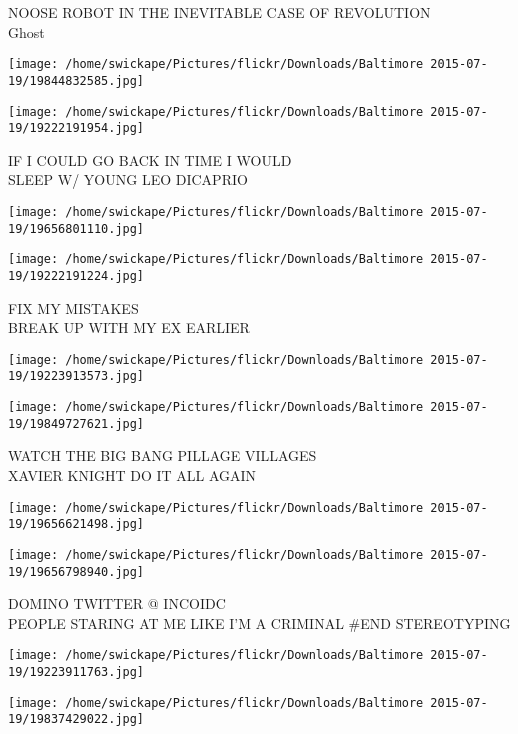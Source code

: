 \documentclass[10pt,letterpaper]{article}
\begin{document}
NOOSE ROBOT IN THE INEVITABLE CASE OF REVOLUTION\\
Ghost
\pagebreak

\texttt{[image: /home/swickape/Pictures/flickr/Downloads/Baltimore 2015-07-19/19844832585.jpg]}

\vspace{0.25in}
\texttt{[image: /home/swickape/Pictures/flickr/Downloads/Baltimore 2015-07-19/19222191954.jpg]}

IF I COULD GO BACK IN TIME I WOULD\\
SLEEP W/ YOUNG LEO DICAPRIO
\pagebreak

\texttt{[image: /home/swickape/Pictures/flickr/Downloads/Baltimore 2015-07-19/19656801110.jpg]}

\vspace{0.25in}
\texttt{[image: /home/swickape/Pictures/flickr/Downloads/Baltimore 2015-07-19/19222191224.jpg]}

FIX MY MISTAKES\\
BREAK UP WITH MY EX EARLIER
\pagebreak

\texttt{[image: /home/swickape/Pictures/flickr/Downloads/Baltimore 2015-07-19/19223913573.jpg]}

\vspace{0.25in}
\texttt{[image: /home/swickape/Pictures/flickr/Downloads/Baltimore 2015-07-19/19849727621.jpg]}

WATCH THE BIG BANG PILLAGE VILLAGES\\
XAVIER KNIGHT DO IT ALL AGAIN
\pagebreak

\texttt{[image: /home/swickape/Pictures/flickr/Downloads/Baltimore 2015-07-19/19656621498.jpg]}

\vspace{0.25in}
\texttt{[image: /home/swickape/Pictures/flickr/Downloads/Baltimore 2015-07-19/19656798940.jpg]}

DOMINO TWITTER @ INCOIDC\\
PEOPLE STARING AT ME LIKE I'M A CRIMINAL \#END STEREOTYPING
\pagebreak

\texttt{[image: /home/swickape/Pictures/flickr/Downloads/Baltimore 2015-07-19/19223911763.jpg]}

\vspace{0.25in}
\texttt{[image: /home/swickape/Pictures/flickr/Downloads/Baltimore 2015-07-19/19837429022.jpg]}
\end{document}
